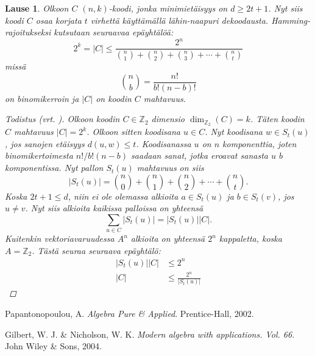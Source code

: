 \documentclass[a4paper,12pt,leqno,oneside]{report} %
\theoremstyle{plain}
\newtheorem{lause}{Lause}[chapter]
\theoremstyle{definition}
\theoremstyle{remark}
\numberwithin{equation}{chapter}
\newcommand*{\Zset}{\mathbb{Z}}  %
\newcommand*{\abs}[1]{\left\lvert#1\right\rvert}   %
\begin{document}
    \begin{lause}\label{lause:Hammingrajoitus}
        Olkoon $C$ $(n, k)$-koodi, jonka minimietäisyys on $d \ge 2t +1$. Nyt siis koodi $C$ osaa korjata $t$ virhettä käyttämällä lähin-naapuri dekoodausta. Hamming-rajoitukseksi kutsutaan seuraavaa epäyhtälöä:
        \[
            2^k = \abs{C} \le \frac{2^n}{\binom{n}{1}+\binom{n}{2}+\binom{n}{3}+\cdots+\binom{n}{t}}
        \]
        missä
        \[
            \binom{n}{b} = \frac{n!}{b!(n-b)!}
        \]
        on binomikerroin ja $\abs{C}$ on koodin $C$ mahtavuus.
        \begin{proof}[Todistus \upshape(vrt. {\cite[s.495]{PA}})]\label{tod:Hammingrajoitus}
            Olkoon koodin $C \in \Zset_2$ dimensio $\dim_{\Zset_2}(C) = k$. Täten koodin $C$ mahtavuus $\abs{C} = 2^k$. Olkoon sitten koodisana $u \in C$. Nyt koodisana $w \in S_t(u)$, jos sanojen etäisyys $d(u,w) \le t$. Koodisanassa $u$ on $n$ komponenttia, joten binomikertoimesta $n! / b!(n-b)\!$ saadaan sanat, jotka eroavat sanasta $u$ $b$ komponentissa. Nyt pallon $S_t(u)$ mahtavuus on siis
            \[
                \abs{S_t(u)} = \binom{n}{0} + \binom{n}{1} +\binom{n}{2} +  \cdots + \binom{n}{t}.
            \]
            Koska $2t + 1 \le d$, niin ei ole olemassa alkioita $a \in S_t(u)$ ja $b \in S_t(v)$, jos $u \neq v$. Nyt siis alkioita kaikissa palloissa on yhteensä
            \[
                \sum_{u \in C}\abs{S_t(u)} = \abs{S_t(u)}\abs{C}.
            \]
            Kuitenkin vektoriavaruudessa $A^n$ alkioita on yhteensä $2^n$ kappaletta, koska $A = \Zset_2$.
            Tästä seuraa seuraava epäyhtälö:
            \begin{align*}
                \abs{S_t(u)}\abs{C} &\le 2^n \\
                \abs{C} &\le \frac{2^n}{\abs{S_t(u)}} 
            \end{align*}

        \end{proof}
    \end{lause}

    \begin{thebibliography}{9}


        Papantonopoulou, A.
        \emph{Algebra Pure \& Applied}.
        Prentice-Hall, 2002.

        Gilbert, W. J. \& Nicholson, W. K.
        \emph{Modern algebra with applications. Vol. 66}.
        John Wiley \& Sons, 2004.

\end{thebibliography}
\end{document}
